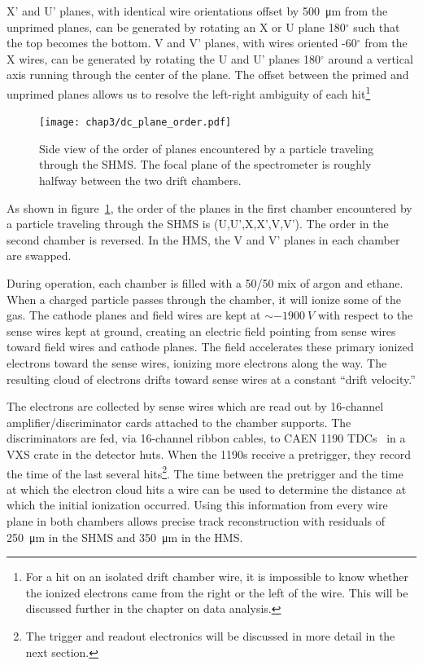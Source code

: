 X' and U' planes, with identical wire orientations offset by
\SI{500}{\micro\meter} from the unprimed planes, can be generated by rotating
an X or U plane 180$^\circ$ such that the top becomes the bottom.
V and V' planes, with wires oriented -60$^\circ$ from the X wires, can be
generated by rotating the U and U' planes 180$^\circ$ around a vertical axis
running through the center of the plane.
The offset between the primed and unprimed planes allows us to resolve the
left-right ambiguity of each hit\footnote{For a hit on an isolated drift
chamber wire, it is impossible to know whether the ionized electrons came from
the right or the left of the wire. This will be discussed further in the
chapter on data analysis.}

\begin{figure}[!h]
    \centering
    \texttt{[image: chap3/dc\_plane\_order.pdf]}
    \caption[Side view of the order of planes encountered by a particle
             traveling through the SHMS.]{Side view of the order of planes encountered by a particle
             traveling through the SHMS. The focal plane of the spectrometer
             is roughly halfway between the two drift chambers.}
    \label{fig:shms_plane_order}
\end{figure}

As shown in figure~\ref{fig:shms_plane_order}, the order of the planes in the
first chamber encountered by a particle traveling through the SHMS is
(U,U',X,X',V,V').
The order in the second chamber is reversed.
In the HMS, the V and V' planes in each chamber are swapped.

During operation, each chamber is filled with a 50/50 mix of argon and ethane.
When a charged particle passes through the chamber, it will ionize some of
the gas.
The cathode planes and field wires are kept at $\sim-\SI{1900}{V}$ with respect
to the sense wires kept at ground, creating an electric field pointing from
sense wires toward field wires and cathode planes.
The field accelerates these primary ionized electrons toward the sense wires,
ionizing more electrons along the way.
The resulting cloud of electrons drifts toward sense wires at a
constant ``drift velocity.''

The electrons are collected by sense wires which are read out by 16-channel
amplifier/discriminator cards attached to the chamber supports.
The discriminators are fed, via 16-channel ribbon cables, to CAEN 1190
TDCs~\cite{CAEN_1190_manual} in a VXS crate in the detector huts.
When the 1190s receive a pretrigger, they record the time of the last several
hits\footnote{The trigger and readout electronics will be discussed in more
detail in the next section.}.
The time between the pretrigger and the time at which the electron cloud hits
a wire can be used to determine the distance at which the initial ionization
occurred.
Using this information from every wire plane in both chambers allows
precise track reconstruction with residuals of \SI{250}{\micro\meter} in the
SHMS and \SI{350}{\micro\meter} in the HMS.

